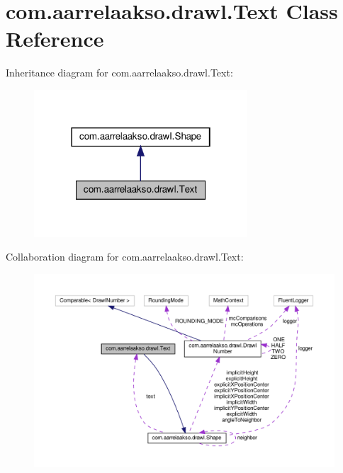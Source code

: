 \hypertarget{classcom_1_1aarrelaakso_1_1drawl_1_1_text}{}\section{com.\+aarrelaakso.\+drawl.\+Text Class Reference}
\label{classcom_1_1aarrelaakso_1_1drawl_1_1_text}


Inheritance diagram for com.\+aarrelaakso.\+drawl.\+Text\+:\nopagebreak
\begin{figure}[H]
\begin{center}
\leavevmode
\includegraphics[width=226pt]{dd/dcf/classcom_1_1aarrelaakso_1_1drawl_1_1_text__inherit__graph}
\end{center}
\end{figure}


Collaboration diagram for com.\+aarrelaakso.\+drawl.\+Text\+:
\nopagebreak
\begin{figure}[H]
\begin{center}
\leavevmode
\includegraphics[width=350pt]{df/d69/classcom_1_1aarrelaakso_1_1drawl_1_1_text__coll__graph}
\end{center}
\end{figure}
